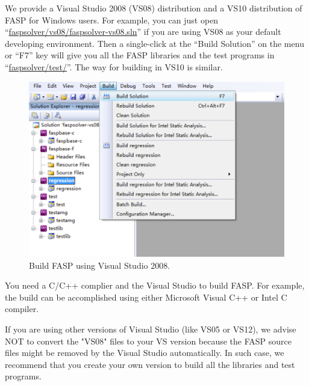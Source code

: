 \documentclass[11pt]{memoir}
\begin{document}
We provide a Visual Studio 2008 (VS08) distribution and a VS10
distribution of FASP for Windows users. For example, you can just open
``\url{faspsolver/vs08/faspsolver-vs08.sln}'' if you are using VS08 as
your default developing environment. Then a single-click at the
``Build Solution'' on the menu or ``F7'' key will give you all the
FASP libraries and the test programs in
``\url{faspsolver/test/}''. The way for building in VS10 is similar.
\begin{figure}[htbp] %
   \centering
   \includegraphics[width=\linewidth]{fig/build-fasp-win7.pdf} 
   \caption{Build FASP using Visual Studio 2008.}
   \label{fig:build}
\end{figure}

\begin{snugshade}\noindent
  You need a C/C++ complier and the Visual Studio to build FASP. For
  example, the build can be accomplished using either Microsoft Visual
  C++ or Intel C compiler. %
\end{snugshade}

\begin{snugshade}\noindent
  If you are using other versions of Visual Studio (like VS05 or
  VS12), we advise NOT to convert the "VS08" files to your VS version
  because the FASP source files might be {\color{red}removed} by the
  Visual Studio automatically. In such case, we recommend that you
  create your own version to build all the libraries and test
  programs.
\end{snugshade}
\end{document}
